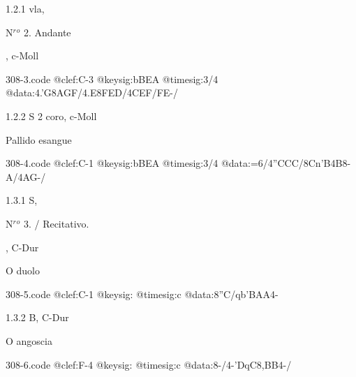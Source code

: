 \documentclass[twocolumn]{book}
\begin{document}
\newline
%
\par 1.2.1  vla, \begin{itshape}N$^r$$^o$ 2. Andante\end{itshape}, c-Moll  
\begin{filecontents*}{308-3.code}
@clef:C-3
@keysig:bBEA
@timesig:3/4
@data:4.'G{8AGF}/4.E{8FED}/4CEF/FE-/
\end{filecontents*}
\newline
%
\par 1.2.2  S 2 coro, c-Moll\newline \begin{footnotesize} Pallido esangue \end{footnotesize}  
\begin{filecontents*}{308-4.code}
@clef:C-1
@keysig:bBEA
@timesig:3/4
@data:=6/4''CCC/{8Cn'B}4B8-A/4AG-/
\end{filecontents*}
\newline
%
\par 1.3.1  S, \begin{itshape}N$^r$$^o$ 3. / Recitativo.\end{itshape}, C-Dur\newline \begin{footnotesize} O duolo \end{footnotesize}  
\begin{filecontents*}{308-5.code}
@clef:C-1
@keysig:
@timesig:c
@data:8''C/qb'BAA4-
\end{filecontents*}
\newline
%
\par 1.3.2  B, C-Dur\newline \begin{footnotesize} O angoscia \end{footnotesize}  
\begin{filecontents*}{308-6.code}
@clef:F-4
@keysig:
@timesig:c
@data:8-/4-'DqC8,BB4-/
\end{filecontents*}
\end{document}
